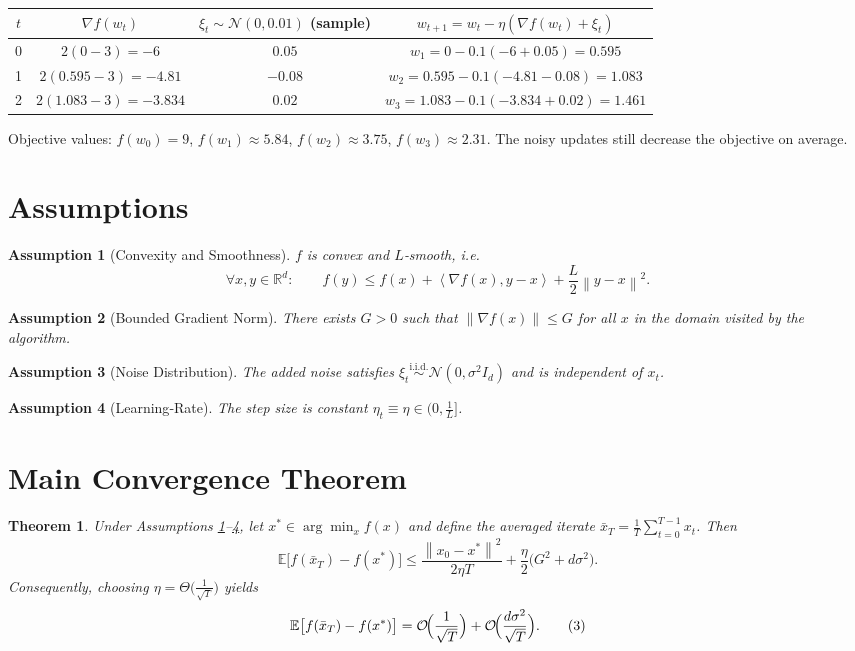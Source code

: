 \documentclass{article}
\newtheorem{theorem}{Theorem}
\newtheorem{assumption}{Assumption}
\newcommand{\EE}{\mathbb{E}}
\newcommand{\RR}{\mathbb{R}}
\newcommand{\norm}[1]{\left\lVert #1 \right\rVert}
\newcommand{\inner}[2]{\left\langle #1,#2 \right\rangle}
\begin{document}
\begin{center}
\begin{tabular}{c|c|c|c}
$t$ & $\nabla f(w_{t})$ & $\xi_{t}\sim\mathcal{N}(0,0.01)$ (sample) & $w_{t+1}=w_{t}-\eta(\nabla f(w_{t})+\xi_{t})$\\ \hline
0 & $2(0-3)=-6$ & $0.05$ & $w_{1}=0-0.1(-6+0.05)=0.595$\\
1 & $2(0.595-3)=-4.81$ & $-0.08$ & $w_{2}=0.595-0.1(-4.81-0.08)=1.083$\\
2 & $2(1.083-3)=-3.834$ & $0.02$ & $w_{3}=1.083-0.1(-3.834+0.02)=1.461$\\
\end{tabular}
\end{center}
Objective values: $f(w_{0})=9$, $f(w_{1})\approx5.84$, $f(w_{2})\approx3.75$, $f(w_{3})\approx2.31$.  
The noisy updates still decrease the objective on average.

\newpage
\section*{Assumptions}
\begin{assumption}[Convexity and Smoothness]\label{as:convex}
$f$ is convex and $L$‑smooth, i.e.
\[
\forall x,y\in\RR^{d}:\qquad 
f(y)\le f(x)+\inner{\nabla f(x)}{y-x}+\frac{L}{2}\norm{y-x}^{2}.
\tag{A1}
\]
\end{assumption}
\begin{assumption}[Bounded Gradient Norm]\label{as:bounded}
There exists $G>0$ such that $\norm{\nabla f(x)}\le G$ for all $x$ in the domain visited by the algorithm.
\end{assumption}
\begin{assumption}[Noise Distribution]\label{as:noise}
The added noise satisfies $\xi_{t}\stackrel{\text{i.i.d.}}{\sim}\mathcal{N}(0,\sigma^{2}I_{d})$ and is independent of $x_{t}$.
\end{assumption}
\begin{assumption}[Learning‑Rate]\label{as:lr}
The step size is constant $\eta_{t}\equiv\eta\in(0,\tfrac{1}{L}]$.
\end{assumption}

\section*{Main Convergence Theorem}
\begin{theorem}\label{thm:conv}
Under Assumptions \ref{as:convex}–\ref{as:lr}, let $x^{\ast}\in\arg\min_{x}f(x)$ and define the averaged iterate $\bar x_{T}\!=\!\tfrac{1}{T}\sum_{t=0}^{T-1}x_{t}$. Then
\[
\EE\bigl[f(\bar x_{T})-f(x^{\ast})\bigr]
\le
\frac{\norm{x_{0}-x^{\ast}}^{2}}{2\eta T}
+\frac{\eta}{2}\bigl(G^{2}+d\sigma^{2}\bigr).
\tag{2}
\]
Consequently, choosing $\eta=\Theta\!\bigl(\tfrac{1}{\sqrt{T}}\bigr)$ yields
\[
\EE\bigl[f(\bar x_{T})-f(x^{\ast})\bigr]=\mathcal{O}\!\Bigl(\frac{1}{\sqrt{T}}\Bigr)
+ \mathcal{O}\!\Bigl(\frac{d\sigma^{2}}{\sqrt{T}}\Bigr).
\tag{3}
\]
\end{theorem}
\end{document}
